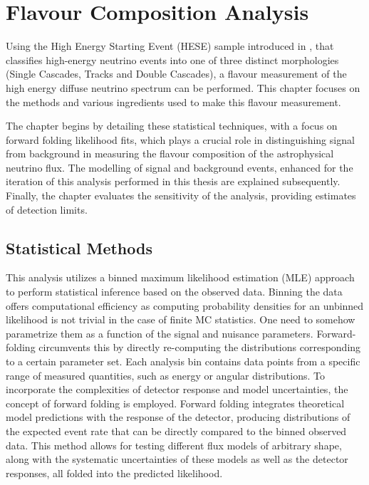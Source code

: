 \setchapterpreamble[u]{\margintoc}
\chapter{Flavour Composition Analysis}
Using the High Energy Starting Event (HESE) sample introduced in , that classifies high-energy neutrino events into one of three distinct morphologies (Single Cascades, Tracks and Double Cascades), a flavour measurement of the high energy diffuse neutrino spectrum can be performed. This chapter focuses on the methods and various ingredients used to make this flavour measurement. 

The chapter begins by detailing these statistical techniques, with a focus on forward folding likelihood fits, which plays a crucial role in distinguishing signal from background in measuring the flavour composition of the astrophysical neutrino flux. The modelling of signal and background events, enhanced for the iteration of this analysis performed in this thesis are explained subsequently. Finally, the chapter evaluates the sensitivity of the analysis, providing estimates of detection limits.
\section{Statistical Methods}
\label{sec:analysis}
This analysis utilizes a binned maximum likelihood estimation (MLE) approach to perform statistical inference based on the observed data. Binning the data offers computational efficiency as computing probability densities for an unbinned likelihood is not trivial in the case of finite MC statistics. One need to somehow parametrize them as a function of the signal and nuisance parameters. Forward-folding circumvents this by directly re-computing the distributions corresponding to a certain parameter set. Each analysis bin contains data points from a specific range of measured quantities, such as energy or angular distributions. To incorporate the complexities of detector response and model uncertainties, the concept of forward folding is employed. Forward folding integrates theoretical model predictions with the response of the detector, producing distributions of the expected event rate that can be directly compared to the binned observed data. This method allows for testing different flux models of arbitrary shape, along with the systematic uncertainties of these models as well as the detector responses, all folded into the predicted likelihood. 

